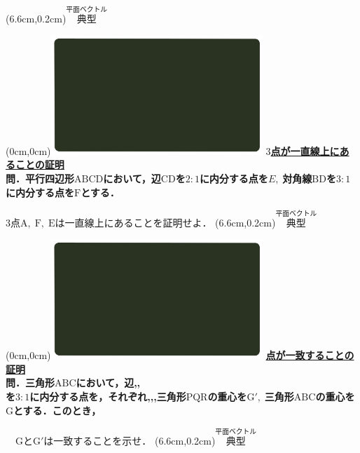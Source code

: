 \documentclass[10pt,
fleqn,
dvipdfmx,
uplatex
]{jsarticle}
\begin{document}
\at(6.6cm,0.2cm){\small\color{bradorange}$\overset{\text{平面ベクトル}}{\text{典型}}$}


\newpage



\at(0cm,0cm){\includegraphics[width=8cm,bb=0 0 1920 1080]{./media_local/smart_background/平面ベクトル.jpeg}}
{\color{orange}\bf\boldmath\large\underline{$3$点が一直線上にあることの証明}}\vspace{0.3zw}\\
\large 
\bf\boldmath 問．平行四辺形$\text{ABCD}$において，辺$\text{CD}$を$2:1$に内分する点を$E,\;$対角線$\text{BD}$を$3:1$に内分する点を$\text{F}$とする．

\Large $3$点$\text{A},\;\text{F},\;\text{E}$は一直線上にあることを証明せよ．
\at(6.6cm,0.2cm){\small\color{bradorange}$\overset{\text{平面ベクトル}}{\text{典型}}$}


\newpage



\at(0cm,0cm){\includegraphics[width=8cm,bb=0 0 1920 1080]{./media_local/smart_background/平面ベクトル.jpeg}}
{\color{orange}\bf\boldmath\Large\underline{点が一致することの証明}}\vspace{0.3zw}\\
\large 
\bf\boldmath 問．三角形$\text{ABC}$において，辺,\;,\;\\
を$3:1$に内分する点を，それぞれ,\;,\;,\;三角形$\text{PQR}$の重心を$\text{G}',\;$三角形$\text{ABC}$の重心を$\text{G}$とする．このとき，

\Large 
\ \ $\text{G}$と$\text{G}'$は一致することを示せ．
\at(6.6cm,0.2cm){\small\color{bradorange}$\overset{\text{平面ベクトル}}{\text{典型}}$}
\end{document}
